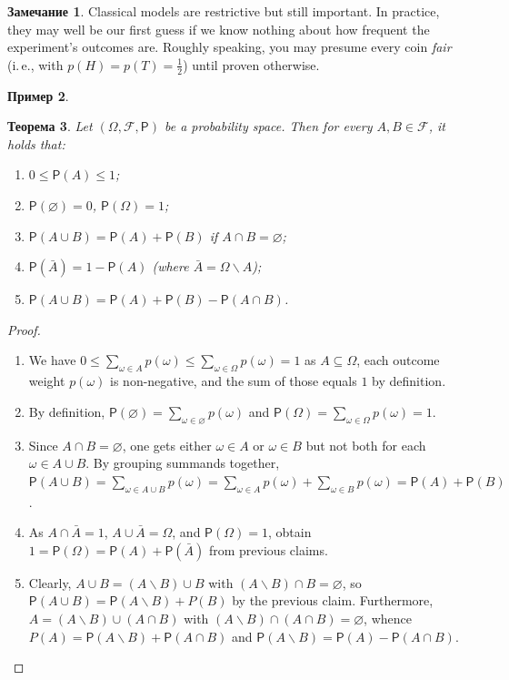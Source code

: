 \documentclass[12pt,notitlepage]{article}
\theoremstyle{plain}
\newtheorem{thm}{Теорема}[section]
\theoremstyle{definition}
\newtheorem{exm}[thm]{Пример}
\newtheorem{rem}[thm]{Замечание}
\theoremstyle{plain}
\newcommand{\sbs}{\subseteq}
\renewcommand{\setminus}{\smallsetminus}
\newcommand{\void}{\varnothing}
\newcommand{\1}{\mathbf{1}}
\newcommand{\0}{\mathbf{0}}
\newcommand{\mF}{\mathcal{F}}
\renewcommand{\P}{\mathsf{P}}
\newcommand{\mcomm}[1]{}
\begin{document}
\begin{rem}
	Classical models are restrictive but still important. In practice, they may well be our first guess if we know nothing about how frequent the experiment's outcomes are. Roughly speaking, you may presume every coin \emph{fair} (i.\,e., with $p(H) = p(T) = \frac{1}{2}$) until proven otherwise.
\end{rem}
\mcomm{Here goes that joke about equiprobability: \emph{What are the chances to come across a dinosaur on the street? One out of two for you either meet it or not!}}

\begin{exm}
	
\end{exm}


\begin{thm}\label{prob:prob_prop}
	Let $(\Omega, \mF, \P)$ be a probability space. Then for every $A, B \in \mF$, it holds that:
	\begin{enumerate}
		\item $0 \leq \P(A) \leq 1$;
		\item $\P(\void) = 0$, $\P(\Omega) = 1$;
		\item $\P(A \cup B) = \P(A) + \P(B)$ if $A \cap B = \void$;
		\item $\P(\bar A) = 1 - \P(A)$ (where $\bar A = \Omega \setminus A$);
		\item $\P(A \cup B) = \P(A) + \P(B) - \P(A \cap B)$.
	\end{enumerate}
\end{thm}
\begin{proof}\phantom{x}
	\begin{enumerate}
		\item We have $0 \leq \sum_{\omega \in A} p(\omega) \leq \sum_{\omega \in \Omega} p(\omega) = 1$ as $A \sbs \Omega$, each outcome weight $p(\omega)$ is non-negative, and the sum of those equals $1$ by definition.
		\item By definition, $\P(\void) = \sum_{\omega \in \void} p(\omega)$ and $\P(\Omega) = \sum_{\omega \in \Omega} p(\omega) = 1$.
		\item Since $A \cap B = \void$, one gets either $\omega \in A$ or $\omega \in B$ but not both for each $\omega \in A \cup B$. By grouping summands together, $\P(A \cup B) = \sum_{\omega \in A \cup B} p(\omega) = \sum_{\omega \in A} p(\omega) + \sum_{\omega \in B} p(\omega) = \P(A) + \P(B)$.
		\item As $A \cap \bar A = 1$, $A \cup \bar A = \Omega$, and $\P(\Omega) = 1$, obtain $1 = \P(\Omega) = \P(A) + \P(\bar A)$ from previous claims.
		\item Clearly, $A \cup B = (A \setminus B) \cup B$ with $(A \setminus B) \cap B = \void$, so $\P(A \cup B) = \P(A \setminus B) + P(B)$ by the previous claim. Furthermore, $A = (A \setminus B) \cup (A \cap B)$ with $(A \setminus B) \cap (A \cap B) = \void$, whence $P(A) = \P(A \setminus B) + \P(A \cap B)$ and $\P(A \setminus B) = \P(A) - \P(A \cap B)$.
	\end{enumerate}
\end{proof}
\end{document}
